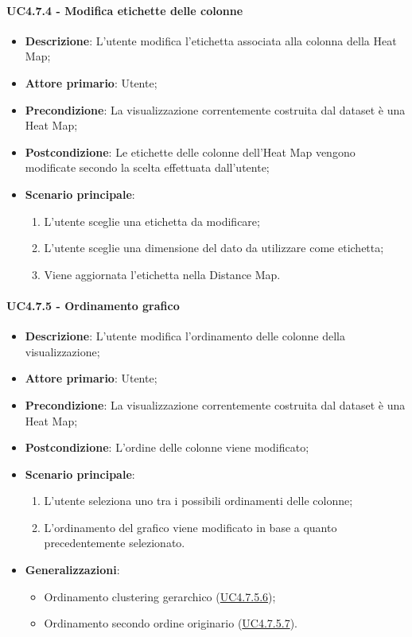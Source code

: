 \paragraph{UC4.7.4 - Modifica etichette delle colonne}
\label{par:uc4.7.4}
\begin{itemize}
    \item \textbf{Descrizione}:     L'utente modifica l'etichetta associata alla colonna della Heat Map;
    \item \textbf{Attore primario}: Utente;
    \item \textbf{Precondizione}:   La visualizzazione correntemente costruita dal dataset è una Heat Map;
    \item \textbf{Postcondizione}:  Le etichette delle colonne dell'Heat Map vengono modificate secondo la scelta effettuata dall'utente;
    \item \textbf{Scenario principale}:
    \begin{enumerate}
        \item L'utente sceglie una etichetta da modificare;
        \item L'utente sceglie una dimensione del dato da utilizzare come etichetta;
        \item Viene aggiornata l'etichetta nella Distance Map.
    \end{enumerate}
\end{itemize}

\paragraph{UC4.7.5 - Ordinamento grafico}
\label{par:uc4.7.5}
\begin{itemize}
    \item \textbf{Descrizione}:     L'utente modifica l'ordinamento delle colonne della visualizzazione;
    \item \textbf{Attore primario}: Utente;
    \item \textbf{Precondizione}:   La visualizzazione correntemente costruita dal dataset è una Heat Map;
    \item \textbf{Postcondizione}:  L'ordine delle colonne viene modificato;
    \item \textbf{Scenario principale}:
    \begin{enumerate}
        \item L'utente seleziona uno tra i possibili ordinamenti delle colonne;
        \item L'ordinamento del grafico viene modificato in base a quanto precedentemente selezionato.
    \end{enumerate}
    \item \textbf{Generalizzazioni}:
    \begin{itemize}
        \item Ordinamento clustering gerarchico (\hyperref[spar:uc4.7.5.6]{UC4.7.5.6});
        \item Ordinamento secondo ordine originario (\hyperref[spar:uc4.7.5.7]{UC4.7.5.7}).
    \end{itemize}
\end{itemize}

